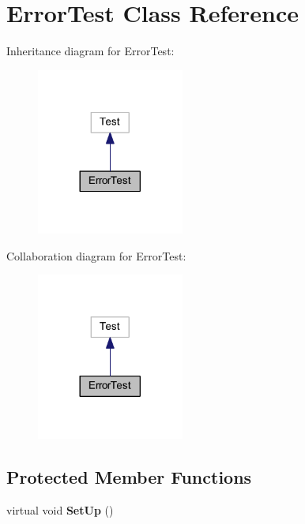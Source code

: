 \hypertarget{class_error_test}{}\section{Error\+Test Class Reference}
\label{class_error_test}


Inheritance diagram for Error\+Test\+:
\nopagebreak
\begin{figure}[H]
\begin{center}
\leavevmode
\includegraphics[width=137pt]{class_error_test__inherit__graph}
\end{center}
\end{figure}


Collaboration diagram for Error\+Test\+:
\nopagebreak
\begin{figure}[H]
\begin{center}
\leavevmode
\includegraphics[width=137pt]{class_error_test__coll__graph}
\end{center}
\end{figure}
\subsection*{Protected Member Functions}
\begin{DoxyCompactItemize}
\item 
\hypertarget{class_error_test_a282955d762cb937af68efea62c37fccd}{}\label{class_error_test_a282955d762cb937af68efea62c37fccd} 
virtual void {\bfseries Set\+Up} ()
\end{DoxyCompactItemize}
